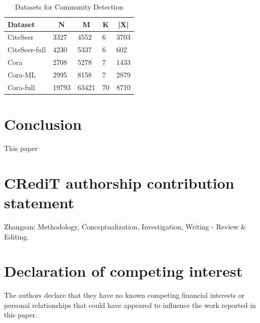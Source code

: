 \documentclass[a4paper,fleqn]{cas-dc}
\begin{document}
\begin{sloppypar}
	\begin{table}[width=.9\linewidth,cols=4,pos=ht]
		\caption{Datasets for Community Detection}
		\label{tbl1}
		\begin{tabular}{lllll}
			\hline
			\textbf{Dataset} & \multicolumn{1}{c}{\textbf{N}} & \multicolumn{1}{c}{\textbf{M}} & \multicolumn{1}{c}{\textbf{K}} & \multicolumn{1}{c}{\textbf{|X|}} \\ \hline
			CiteSeer         & 3327                           & 4552                           & 6                              & 3703                             \\
			CiteSeer-full    & 4230                           & 5337                           & 6                              & 602                              \\
			Cora             & 2708                           & 5278                           & 7                              & 1433                             \\
			Cora-ML          & 2995                           & 8158                           & 7                              & 2879                             \\
			Cora-full        & 19793                          & 63421                          & 70                             & 8710                             \\
		\end{tabular}
	\end{table}


	\section{Conclusion}
	\label{Conclusion}
	\par{
		This paper
	}

	\section*{CRediT authorship contribution statement}
	\par{Zhangsan: Methodology, Conceptualization, Investigation, Writing - Review \& Editing. }

	\section*{Declaration of competing interest}
	\par{The authors declare that they have no known competing financial interests or personal relationships that could have appeared to influence the work reported in this paper.}


\end{sloppypar}
\end{document}
